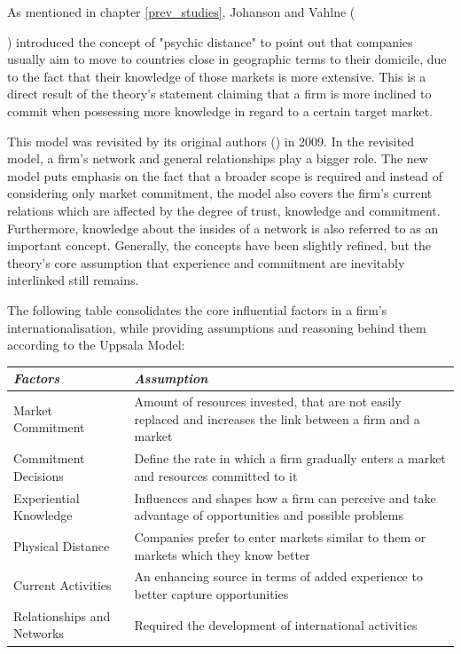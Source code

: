 \documentclass[11pt,a4paper]{article}
\begin{document}
As mentioned in chapter \ref{prev_studies}, Johanson and Vahlne ({\citeyear{johansonInternationalizationProcessFirm1977}) introduced the concept of "psychic distance" to point out that companies usually aim to move to countries close in geographic terms to their domicile, due to the fact that their knowledge of those markets is more extensive. This is a direct result of the theory's statement claiming that a firm is more inclined to commit when possessing more knowledge in regard to a certain target market. \par
This model was revisited by its original authors (\citeauthor{johansonUppsalaInternationalizationProcess2009}) in 2009. In the revisited model, a firm's network and general relationships play a bigger role. The new model puts emphasis on the fact that a broader scope is required and instead of considering only market commitment, the model also covers the firm's current relations which are affected by the degree of trust, knowledge and commitment. Furthermore, knowledge about the insides of a network is also referred to as an important concept. Generally, the concepts have been slightly refined, but the theory's core assumption that experience and commitment are inevitably interlinked still remains. \par
The following table consolidates the core influential factors in a firm's internationalisation, while providing assumptions and reasoning behind them according to the Uppsala Model:

\vspace{8mm}
\begin{table}[H] \centering 
\begin{tabular}{P{5cm}P{10cm}}
  \toprule
  \emph{Factors} & \emph{Assumption}  \\ 
    \midrule
  Market Commitment & Amount of resources invested, that are not easily replaced and increases the link between a firm and a market \\
                  Commitment Decisions & Define the rate in which a firm gradually enters a market and resources committed to it \\
    Experiential Knowledge & Influences and shapes how a firm can perceive and take advantage of opportunities and possible problems \\
        Physical Distance & Companies prefer to enter markets similar to them or markets which they know better \\
                Current Activities & An enhancing source in terms of added experience to better capture opportunities \\
                Relationships and Networks & Required the development of international activities \\
              

\end{tabular}
\end{table}}
\end{document}
